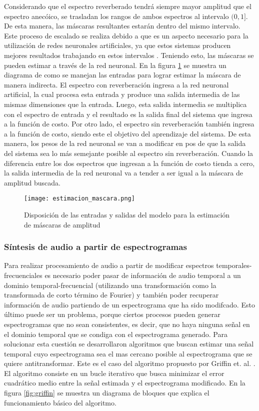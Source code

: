 Considerando que el espectro reverberado tendrá siempre mayor amplitud que el espectro anecóico, se trasladan los rangos de ambos espectros al intervalo $(0, 1]$. De esta manera, las máscaras resultantes estarán dentro del mismo intervalo. Este proceso de escalado se realiza debido a que es un aspecto necesario para la utilización de redes neuronales artificiales, ya que estos sistemas producen mejores resultados trabajando en estos intervalos \cite{lagartija}. 
Teniendo esto, las máscaras se pueden estimar a través de la red neuronal. En la figura \ref{fig:red_estim} se muestra un diagrama de como se manejan las entradas para lograr estimar la máscara de manera indirecta. El espectro con reverberación ingresa a la red neuronal artificial, la cual procesa esta entrada y produce una salida intermedia de las mismas dimensiones que la entrada. Luego, esta salida intermedia se multiplica con el espectro de entrada y el resultado es la salida final del sistema que ingresa a la función de costo. Por otro lado, el espectro sin reverberación también ingresa a la función de costo, siendo este el objetivo del aprendizaje del sistema. De esta manera, los pesos de la red neuronal se van a modificar en pos de que la salida del sistema sea lo más semejante posible al espectro sin reverberación. Cuando la diferencia entre los dos espectros que ingresan a la función de costo tienda a cero, la salida intermedia de la red neuronal va a tender a ser igual a la máscara de amplitud buscada. 

\begin{figure}[H]
  \centering{}
  \texttt{[image: estimacion\_mascara.png]}
  \caption{Disposición de las entradas y salidas del modelo para la estimación de máscaras de amplitud}
  \label{fig:red_estim}
\end{figure}
  


\subsubsection{Síntesis de audio a partir de espectrogramas}

Para realizar procesamiento de audio a partir de modificar espectros temporales-frecuenciales es necesario poder pasar de información de audio temporal a un dominio temporal-frecuencial (utilizando una transformación como la transformada de corto término de Fourier) y también poder recuperar información de audio partiendo de un espectrograma que ha sido modifcado. Esto último puede ser un problema, porque ciertos procesos pueden generar espectrogramas que no sean consistentes, es decir, que no haya ninguna señal en el dominio temporal que se condiga con el espectrograma generado. Para solucionar esta cuestión se desarrollaron algoritmos que buscan estimar una señal temporal cuyo espectrograma sea el mas cercano posible al espectrograma que se quiere antitransformar. Este es el caso del algoritmo propuesto por Griffin et. al. \cite{griffinlim}. El algoritmo consiste en un bucle iterativo que busca minimizar el error cuadrático medio entre la señal estimada y el espectrograma modificado. En la figura \ref{fig:griffin} se muestra un diagrama de bloques que explica el funcionamiento básico del algoritmo. 

